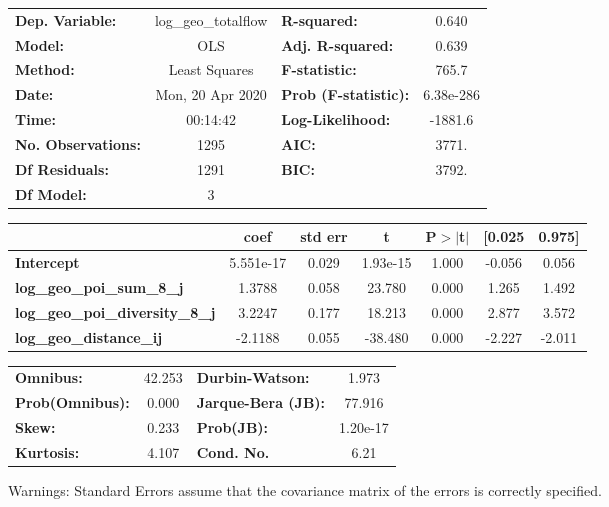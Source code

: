 \begin{center}
\begin{tabular}{lclc}
\toprule
\textbf{Dep. Variable:}                 & log\_geo\_totalflow & \textbf{  R-squared:         } &     0.640   \\
\textbf{Model:}                         &         OLS         & \textbf{  Adj. R-squared:    } &     0.639   \\
\textbf{Method:}                        &    Least Squares    & \textbf{  F-statistic:       } &     765.7   \\
\textbf{Date:}                          &   Mon, 20 Apr 2020  & \textbf{  Prob (F-statistic):} & 6.38e-286   \\
\textbf{Time:}                          &       00:14:42      & \textbf{  Log-Likelihood:    } &   -1881.6   \\
\textbf{No. Observations:}              &          1295       & \textbf{  AIC:               } &     3771.   \\
\textbf{Df Residuals:}                  &          1291       & \textbf{  BIC:               } &     3792.   \\
\textbf{Df Model:}                      &             3       & \textbf{                     } &             \\
\bottomrule
\end{tabular}
\begin{tabular}{lcccccc}
                                        & \textbf{coef} & \textbf{std err} & \textbf{t} & \textbf{P$> |$t$|$} & \textbf{[0.025} & \textbf{0.975]}  \\
\midrule
\textbf{Intercept}                      &    5.551e-17  &        0.029     &  1.93e-15  &         1.000        &       -0.056    &        0.056     \\
\textbf{log\_geo\_poi\_sum\_8\_j}       &       1.3788  &        0.058     &    23.780  &         0.000        &        1.265    &        1.492     \\
\textbf{log\_geo\_poi\_diversity\_8\_j} &       3.2247  &        0.177     &    18.213  &         0.000        &        2.877    &        3.572     \\
\textbf{log\_geo\_distance\_ij}         &      -2.1188  &        0.055     &   -38.480  &         0.000        &       -2.227    &       -2.011     \\
\bottomrule
\end{tabular}
\begin{tabular}{lclc}
\textbf{Omnibus:}       & 42.253 & \textbf{  Durbin-Watson:     } &    1.973  \\
\textbf{Prob(Omnibus):} &  0.000 & \textbf{  Jarque-Bera (JB):  } &   77.916  \\
\textbf{Skew:}          &  0.233 & \textbf{  Prob(JB):          } & 1.20e-17  \\
\textbf{Kurtosis:}      &  4.107 & \textbf{  Cond. No.          } &     6.21  \\
\bottomrule
\end{tabular}
\end{center}

Warnings: \newline
 [1] Standard Errors assume that the covariance matrix of the errors is correctly specified.